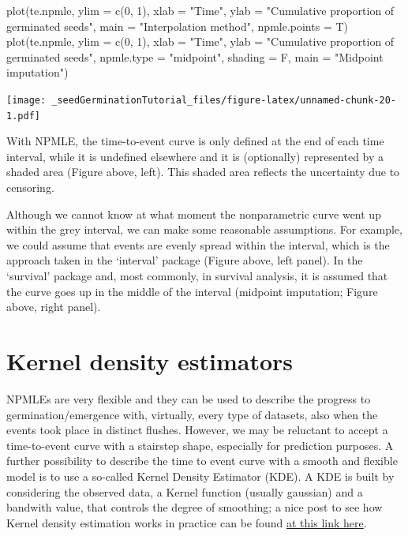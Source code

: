 \documentclass[
]{book}
\newenvironment{Shaded}{\begin{snugshade}}{\end{snugshade}}
\newcommand{\AttributeTok}[1]{\textcolor[rgb]{0.77,0.63,0.00}{#1}}
\newcommand{\DecValTok}[1]{\textcolor[rgb]{0.00,0.00,0.81}{#1}}
\newcommand{\FunctionTok}[1]{\textcolor[rgb]{0.00,0.00,0.00}{#1}}
\newcommand{\NormalTok}[1]{#1}
\newcommand{\StringTok}[1]{\textcolor[rgb]{0.31,0.60,0.02}{#1}}
\begin{document}
\begin{Shaded}
\begin{Highlighting}[]
\FunctionTok{plot}\NormalTok{(te.npmle, }\AttributeTok{ylim =} \FunctionTok{c}\NormalTok{(}\DecValTok{0}\NormalTok{, }\DecValTok{1}\NormalTok{),}
     \AttributeTok{xlab =} \StringTok{"Time"}\NormalTok{, }\AttributeTok{ylab =} \StringTok{"Cumulative proportion of germinated seeds"}\NormalTok{,}
     \AttributeTok{main =} \StringTok{"Interpolation method"}\NormalTok{, }\AttributeTok{npmle.points =}\NormalTok{ T)}
\FunctionTok{plot}\NormalTok{(te.npmle, }\AttributeTok{ylim =} \FunctionTok{c}\NormalTok{(}\DecValTok{0}\NormalTok{, }\DecValTok{1}\NormalTok{),}
     \AttributeTok{xlab =} \StringTok{"Time"}\NormalTok{, }\AttributeTok{ylab =} \StringTok{"Cumulative proportion of germinated seeds"}\NormalTok{,}
     \AttributeTok{npmle.type =} \StringTok{"midpoint"}\NormalTok{, }\AttributeTok{shading =}\NormalTok{ F,}
     \AttributeTok{main =} \StringTok{"Midpoint imputation"}\NormalTok{)}
\end{Highlighting}
\end{Shaded}

\texttt{[image: \_seedGerminationTutorial\_files/figure-latex/unnamed-chunk-20-1.pdf]}

With NPMLE, the time-to-event curve is only defined at the end of each time interval, while it is undefined elsewhere and it is (optionally) represented by a shaded area (Figure above, left). This shaded area reflects the uncertainty due to censoring.

Although we cannot know at what moment the nonparametric curve went up within the grey interval, we can make some reasonable assumptions. For example, we could assume that events are evenly spread within the interval, which is the approach taken in the `interval' package (Figure above, left panel). In the `survival' package and, most commonly, in survival analysis, it is assumed that the curve goes up in the middle of the interval (midpoint imputation; Figure above, right panel).

\hypertarget{kernel-density-estimators}{%
\section{Kernel density estimators}\label{kernel-density-estimators}}

NPMLEs are very flexible and they can be used to describe the progress to germination/emergence with, virtually, every type of datasets, also when the events took place in distinct flushes. However, we may be reluctant to accept a time-to-event curve with a stairstep shape, especially for prediction purposes. A further possibility to describe the time to event curve with a smooth and flexible model is to use a so-called Kernel Density Estimator (KDE). A KDE is built by considering the observed data, a Kernel function (usually gaussian) and a bandwith value, that controls the degree of smoothing; a nice post to see how Kernel density estimation works in practice can be found \href{https://mathisonian.github.io/kde/}{at this link here}.
\end{document}
